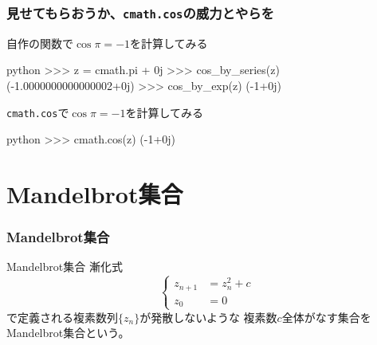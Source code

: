 \documentclass[dvipdfmx,11pt,notheorems]{beamer}
\theoremstyle{definition}
\begin{document}
\begin{frame}[fragile]\frametitle{見せてもらおうか、\texttt{cmath.cos}の威力とやらを}
\begin{exampleblock}{自作の関数で$\cos{\pi} = -1$を計算してみる}
\begin{pygments}{python}
>>> z = cmath.pi + 0j
>>> cos_by_series(z)
(-1.0000000000000002+0j)
>>> cos_by_exp(z)
(-1+0j)
\end{pygments}
\end{exampleblock}

\begin{exampleblock}{\texttt{cmath.cos}で$\cos{\pi} = -1$を計算してみる}
\begin{pygments}{python}
>>> cmath.cos(z)
(-1+0j)
\end{pygments}
\end{exampleblock}

\end{frame}

\section{Mandelbrot集合}

\begin{frame}[fragile]\frametitle{Mandelbrot集合}

\begin{block}{Mandelbrot集合}
漸化式
\begin{equation*}
    \left\{
    \begin{alignedat}{4}
          z_{n+1} &= z^{2}_{n} +c \\
          z_{0} &= 0
    \end{alignedat}
    \right.
\end{equation*}
で定義される複素数列$\{z_{n}\}$が発散しないような
複素数$c$全体がなす集合をMandelbrot集合という。
\end{block}

\end{frame}
\end{document}
